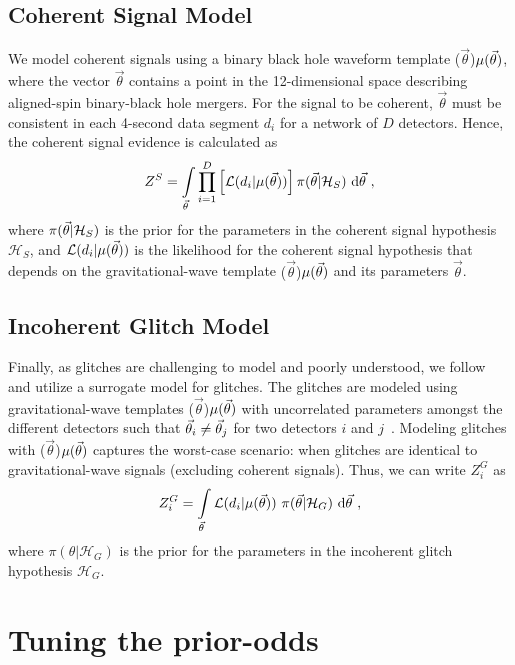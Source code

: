 \documentclass[%
 nofootinbib,
 amsmath,amssymb,
 aps,
 twocolumn,
 superscriptaddress
]{revtex4-2}
\newcommand{\mathcmd}[1]{{\sc \relax\ifmmode#1\else $#1$\fi}\xspace}
\newcommand{\parameters}{\mathcmd{\vec{\theta}}}
\newcommand{\template}{\mathcmd{\mu(\parameters)}}
\begin{document}
\subsection{Coherent Signal Model}
We model coherent signals using a binary black hole waveform template \template, where the vector \parameters contains a point in the 12-dimensional space describing aligned-spin binary-black hole mergers. For the signal to be coherent, \parameters must be consistent in each 4-second data segment $d_i$ for a network of $D$ detectors. Hence, the coherent signal evidence is calculated as
\begin{equation}
\label{eq:zs}
Z^S = \int\limits_{\parameters} \prod\limits^{D}_{i=1} \left[ \mathcal{L}(d_i|\template)\right] \pi(\parameters | \mathcal{H}_S)\  \text{d}\parameters \ ,
\end{equation}
where $\pi(\parameters| \mathcal{H}_S)$ is the prior for the parameters in the coherent signal hypothesis $\mathcal{H}_S$, and $\mathcal{L}(d_i|\template)$ is the likelihood for the coherent signal hypothesis that depends on the gravitational-wave template \template and its parameters \parameters. 

\subsection{Incoherent Glitch Model}
Finally, as glitches are challenging to model and poorly understood, we follow \citet{bci} and utilize a surrogate model for glitches. The glitches are modeled using gravitational-wave templates  \template with uncorrelated parameters amongst the different detectors such that  $\parameters_i \neq \parameters_j$ for two detectors $i$ and $j$~\cite{bci}.  Modeling glitches with \template captures the worst-case scenario: when glitches are identical to gravitational-wave signals (excluding coherent signals). Thus, we can write $Z^G_i$ as 
\begin{equation}
\label{eq:zg}
Z^G_i = \int\limits_{\parameters} \mathcal{L}(d_i|\template)\ \pi(\parameters| \mathcal{H}_G)\  \text{d}\parameters  \ ,
\end{equation}
where $\pi(\theta| \mathcal{H}_G)$ is the prior for the parameters in the incoherent glitch hypothesis $\mathcal{H}_G$. 



\section{Tuning the prior-odds}\label{apdx:tuning-prior-odds}
\end{document}
